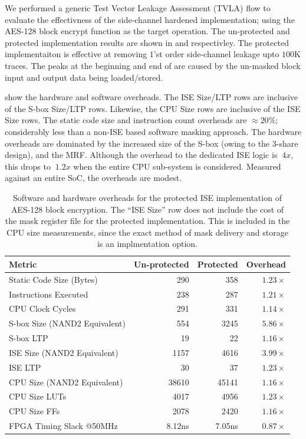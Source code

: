 We performed a generic Test Vector Leakage Assessment (TVLA) \cite{TVLA:13}
flow to evaluate
the effectivness of the side-channel hardened implementation;
using the AES-128 block encrypt function as the target operation.
The un-protected and protected implementation results are shown in
 and
 respectivley.
The protected implementaiton is effective at removing $1$'st
order side-channel leakage upto $100$K traces.
The peaks at the beginning and end of 
are caused by the un-masked block input and output data being loaded/stored.

 show the hardware and software overheads.
The ISE Size/LTP rows are inclusive of the S-box Size/LTP rows.
Likewise, the CPU Size rows are inclusive of the ISE Size rows.
The static code size and instruction count overheads are
$\approx 20\%$; considerably less than a non-ISE based software masking
approach.
The hardware overheads are dominated by the increased size of the
S-box (owing to the 3-share design), and the MRF.
Although the overhead to the dedicated
ISE logic is $~4x$, this drops to $~1.2x$ when the entire
CPU sub-system is considered.
Measured against an entire SoC, the overheads are modest.

\begin{table}[]
\centering
\begin{tabular}{|l|r|r|r|}
\hline
Metric  & Un-protected & Protected  & Overhead \\
\hline
\hline
Static Code Size (Bytes)        & 290         & 358    & $1.23\times$   \\
Instructions Executed           & 238         & 287    & $1.21\times$   \\
CPU Clock Cycles                & 291         & 331    & $1.14\times$   \\
\hline
S-box Size (NAND2 Equivalent)   & 554         & 3245   & $5.86\times$   \\
S-box LTP                       & 19          & 22     & $1.16\times$   \\
ISE Size (NAND2 Equivalent)     & 1157        & 4616   & $3.99\times$   \\
ISE LTP                         & 30          & 37     & $1.23\times$   \\
CPU Size (NAND2 Equivalent)     & 38610       & 45141  & $1.16\times$   \\
CPU Size  LUTs                  & 4017        & 4956   & $1.23\times$   \\
CPU Size  FFs                   & 2078        & 2420   & $1.16\times$   \\
FPGA Timing Slack @50MHz        & 8.12ns      & 7.05ns & $0.87\times$   \\
\hline
\end{tabular}
\caption{
Software and hardware overheads for the protected ISE implementation
of AES-128 block encryption.
The ``ISE Size'' row does not include the cost of the mask register file
for the protected implementation.
This is included in the CPU size measurements, since the exact method
of mask delivery and storage is an implmentation option.
}
\label{tab:sca:sw-hw}
\end{table}

